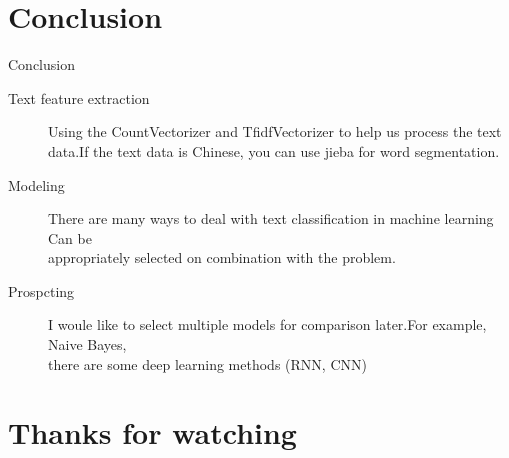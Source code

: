 \documentclass[
 size=12pt,
 paper=smartboard, %
 mode=present, %
 display=slides, %
style=tuliplab,
pauseslide,
fleqn,leqno]{powerdot}
\begin{document}
\section{Conclusion}
\begin{slide}[toc=,bm=]{Conclusion}
\begin{description}
  \item[Text feature extraction] Using the CountVectorizer and TfidfVectorizer to help us process the text\\
  \hspace{5cm}data.If the text data is Chinese, you can use jieba for word segmentation.
  \item[Modeling] There are many ways to deal with text classification in machine learning Can be\\ 
  \hspace{2.3cm}appropriately selected on combination with the problem.  
  \item[Prospcting] I woule like to select multiple models for comparison later.For example, Naive Bayes,\\ 
 \hspace{2.4cm} there are some deep learning methods (RNN, CNN)
\end{description}
\end{slide}

\section{Thanks for watching}


\end{document}
